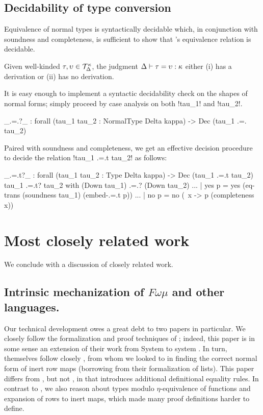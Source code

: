 \documentclass[sigplan,10pt,anonymous,review]{acmart}\settopmatter{printfolios=true,printccs=false,printacmref=false}
\begin{document}
\subsection{Decidability of type conversion}

Equivalence of normal types is syntactically decidable which, in conjunction with soundness and completeness, is sufficient to show that \Rome's equivalence relation is decidable.

\ifthms
\begin{theorem}[Decidability]
  Given well-kinded $\tau, \upsilon \in {\mathcal T}_{\Delta}^{\kappa}$, the judgment $\Delta \vdash \tau = \upsilon : \kappa$ either (i) has a derivation or (ii) has no derivation.
\end{theorem}\fi

It is easy enough to implement a syntactic decidability check on the shapes of normal forms; simply proceed by case analysis on both !tau_1! and !tau_2!.

\begin{agda}
_.=.?_ : forall (tau_1 tau_2 : NormalType Delta kappa) -> Dec (tau_1 .=. tau_2)
\end{agda}

Paired with soundness and completeness, we get an effective decision procedure to decide the relation !tau_1 .=.t tau_2! as follows: 

\begin{agda}
_.=.t?_ : forall (tau_1 tau_2 : Type Delta kappa) -> Dec (tau_1 .=.t tau_2)
tau_1 .=.t? tau_2  with (Down tau_1) .=.? (Down tau_2)
... | yes p = yes 
    (eq-trans 
        (soundness tau_1) 
        (embed-.=.t p))
... | no  p = no (\ x -> p (completeness x))
\end{agda}


\section{Most closely related work}
\label{sec:related-work} 

We conclude with a discussion of closely related work. 

\subsection{Intrinsic mechanization of $F\omega\mu$ and other languages.} Our technical development owes a great debt to two papers in particular. We closely follow the formalization and proof techniques of \citet{ChapmanKNW19}; indeed, this paper is in some sense an extension of their work from System \Fome to system \Rome. In turn, \citet{ChapmanKNW19} themselves follow closely \citet{AllaisBM13}, from whom we looked to in finding the correct normal form of inert row maps (borrowing from their formalization of lists). This paper differs from \citet{ChapmanKNW19}, but not \citet{AllaisBM13}, in that \Rome introduces additional definitional equality rules. In contrast to \citet{ChapmanKNW19}, we also reason about types modulo $\eta$-equivalence of functions and expansion of rows to inert maps, which made many proof definitions harder to define.
\end{document}
